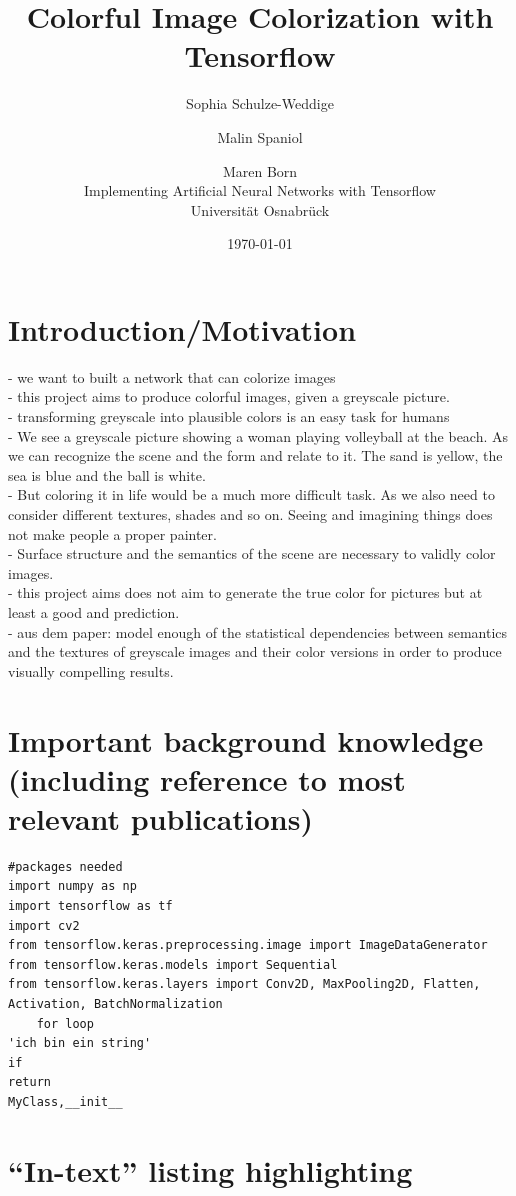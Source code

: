 \documentclass[12pt,letterpaper]{article}
\title{Colorful Image Colorization with Tensorflow}
\date{\today}
\author{Sophia Schulze-Weddige \and Malin Spaniol \and Maren Born \\Implementing Artificial Neural Networks with Tensorflow \\Universität Osnabrück}
\begin{document}
\maketitle
\thispagestyle{empty}

\section{Introduction/Motivation}
- we want to built a network that can colorize images\\
- this project aims to produce colorful images, given a greyscale picture.\\
- transforming greyscale into plausible colors is an easy task for humans\\
- We see a greyscale picture showing a woman playing volleyball at the beach. As we can recognize the scene and the form and relate to it. The sand is yellow, the sea is blue and the ball is white.\\
- But coloring it in life would be a much more difficult task. As we also need to consider different textures, shades and so on. Seeing and imagining things does not make people a proper painter.\\
- Surface structure and the semantics of the scene are necessary to validly color images.\\
- this project aims does not aim to generate the true color for pictures but at least a good and prediction.\\
- aus dem paper: model enough of the statistical dependencies between semantics and the textures of greyscale images and their color versions in order to produce visually compelling results.\\

\section{Important background knowledge (including reference to most relevant publications)}
\begin{lstlisting}
#packages needed
import numpy as np 
import tensorflow as tf 
import cv2
from tensorflow.keras.preprocessing.image import ImageDataGenerator
from tensorflow.keras.models import Sequential
from tensorflow.keras.layers import Conv2D, MaxPooling2D, Flatten, Activation, BatchNormalization
	for loop
'ich bin ein string'
if
return
MyClass,__init__
\end{lstlisting}

\section{``In-text'' listing highlighting}
\end{document}
